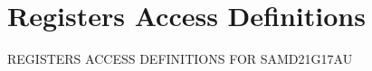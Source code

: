 \hypertarget{group___s_a_m_d21_g17_a_u__reg}{}\section{Registers Access Definitions}
\label{group___s_a_m_d21_g17_a_u__reg}
R\+E\+G\+I\+S\+T\+E\+RS A\+C\+C\+E\+SS D\+E\+F\+I\+N\+I\+T\+I\+O\+NS F\+OR S\+A\+M\+D21\+G17\+AU 